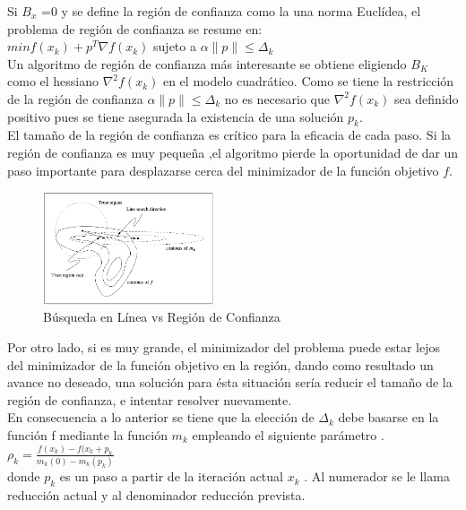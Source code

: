 \documentclass[10pt,journal,compsoc]{styles/IEEEtran}
\begin{document}
Si $B_x$ =0 y se define la regi\'on de confianza como la una norma Eucl\'idea, el problema de regi\'on de confianza se resume en:\\

$min f(x_k)+p^T\nabla f(x_k)$ sujeto a $\alpha\|p\|\leq\Delta_k$\\

Un algoritmo de regi\'on de confianza m\'as interesante se obtiene eligiendo $B_K$ como el hessiano $\nabla^2f(x_k)$ en el modelo cuadr\'atico. Como se tiene la restricci\'on
de la regi\'on de confianza $\alpha\|p\|\leq\Delta_k$ no es necesario que $\nabla^2f(x_k)$ sea definido positivo pues se tiene asegurada la existencia de una soluci\'on $p_k$.\\

El tama\~no de la regi\'on de confianza es cr\'itico para la eficacia de cada paso. Si la
región de confianza es muy  peque\~na ,el algoritmo pierde la oportunidad de dar
un paso importante para desplazarse cerca del minimizador de la función objetivo $f$.\\

\begin{figure}[hbtp]
\centering
\includegraphics[width=0.45\textwidth]{mrc.png}
\caption{B\'usqueda en L\'inea vs Regi\'on de Confianza}
\end{figure}

Por otro lado, si es muy grande, el minimizador del problema puede estar lejos del minimizador
de la funci\'on objetivo en la regi\'on, dando como resultado un avance no deseado, una soluci\'on para \'esta situaci\'on ser\'ia reducir el tamaño de la regi\'on de confianza,
e intentar resolver nuevamente.\\

En consecuencia a lo anterior se tiene que la elecci\'on de $\Delta_k$ debe basarse en la funci\'on f mediante la funci\'on $m_k$ empleando el siguiente par\'ametro . \\

$\rho_k =\frac{f(x_k)-f(x_k+p_k}{m_k(0)-m_k(p_k)}$\\

donde $p_k$ es un paso a partir de la iteraci\'on actual $x_k$ .
Al numerador se le llama reducci\'on actual y al denominador reducci\'on prevista.
\end{document}
